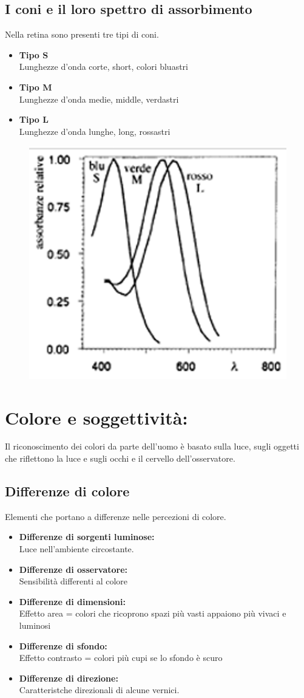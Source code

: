 \documentclass{report}
\begin{document}
	\subsection{I coni e il loro spettro di assorbimento}
	Nella retina sono presenti tre tipi di coni.
	\begin{itemize}
		\item \textbf{Tipo S}\\
		      Lunghezze d'onda corte, short, colori bluastri
		\item \textbf{Tipo M}\\
		      Lunghezze d'onda medie, middle, verdastri
		\item \textbf{Tipo L}\\
		      Lunghezze d'onda lunghe, long, rossastri
	\end{itemize}
	\begin{figure}[htp]
		\centering
		\includegraphics[width=0.5\linewidth]{assorbimento.png}
	\end{figure}
	\section{Colore e soggettività:}
	Il riconoscimento dei colori da parte dell'uomo è basato sulla luce, sugli oggetti che riflettono la luce e sugli occhi e il cervello dell'osservatore.
	\subsection{Differenze di colore}
	Elementi che portano a differenze nelle percezioni di colore.
	\begin{itemize}
		\item \textbf{Differenze di sorgenti luminose:}\\
		      Luce nell'ambiente circostante.
		\item \textbf{Differenze di osservatore:} \\
		      Sensibilità differenti al colore
		\item \textbf{Differenze di dimensioni:} \\
		      Effetto area = colori che ricoprono spazi più vasti appaiono più vivaci e luminosi
		\item \textbf{Differenze di sfondo:} \\
		      Effetto contrasto = colori più cupi se lo sfondo è scuro
		\item \textbf{Differenze di direzione:} \\
		      Caratteristche direzionali di alcune vernici.
	\end{itemize}
		
\end{document}
